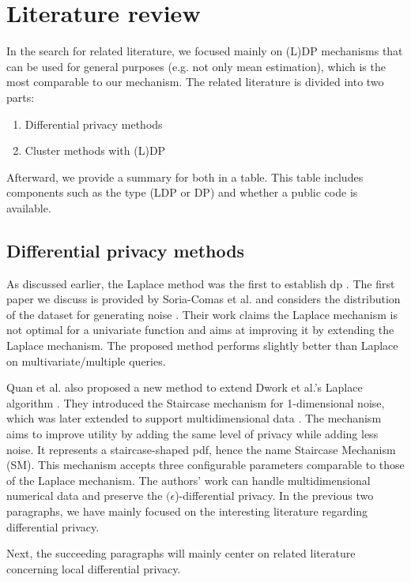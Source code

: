 \section{Literature review} \label{theory:literature-review}
In the search for related literature, we focused mainly on (L)DP mechanisms that can be used for general purposes (e.g. not only mean estimation), which is the most comparable to our mechanism.
The related literature is divided into two parts:
\begin{enumerate}
  \item Differential privacy methods
  \item Cluster methods with (L)DP
\end{enumerate}
Afterward, we provide a summary for both in a table.
This table includes components such as the type (LDP or DP) and whether a public code is available.


\subsection{Differential privacy methods}
As discussed earlier, the Laplace method was the first to establish \gls{dp} \citep{dwork_differential_2006}.
The first paper we discuss is provided by Soria-Comas et al. and considers the distribution of the dataset for generating noise \citep{soria-comas_optimal_2013}.
Their work claims the Laplace mechanism is not optimal for a univariate function and aims at improving it by extending the Laplace mechanism.
The proposed method performs slightly better than Laplace on multivariate/multiple queries.

Quan et al. also proposed a new method to extend Dwork et al.'s Laplace algorithm \citep{geng_staircase_2015}.
They introduced the Staircase mechanism for 1-dimensional noise, which was later extended to support multidimensional data \citep{geng_staircase_2015}.
The mechanism aims to improve utility by adding the same level of privacy while adding less noise.
It represents a staircase-shaped \gls{pdf}, hence the name Staircase Mechanism (SM).
This mechanism accepts three configurable parameters comparable to those of the Laplace mechanism.
The authors' work can handle multidimensional numerical data and preserve the  $(\epsilon$)-differential privacy.
In the previous two paragraphs, we have mainly focused on the interesting literature regarding differential privacy.

Next, the succeeding paragraphs will mainly center on related literature concerning local differential privacy.

